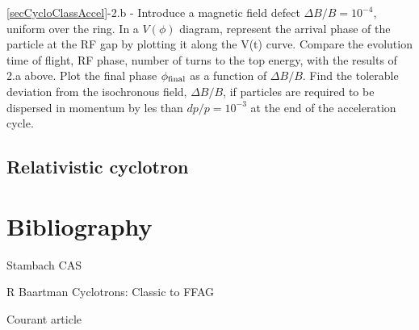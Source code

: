 \noindent \ref{secCycloClassAccel}-2.b - 
Introduce a magnetic field defect $\Delta B/B= 10^{-4}$, uniform over the ring. 
In a $V(\phi)$ diagram, represent  the arrival phase  of the particle at the RF gap
by plotting it along the V(t) curve. 
Compare the evolution time of flight, RF phase, number of turns to the top energy,
 with the results of 2.a above.
 Plot the final phase $\phi_{\rm final}$ as a function of $\Delta B/B$. 
 Find the tolerable deviation from the isochronous field, 
$\Delta B/B$,  if particles are required to be dispersed in momentum by les 
than $dp/p=10^{-3}$ at the end of the acceleration cycle.




\subsection{Relativistic cyclotron}




\section{Bibliography \label{SecBiblioCyclotron}}

Stambach CAS

R Baartman Cyclotrons: Classic to FFAG

 Courant article
